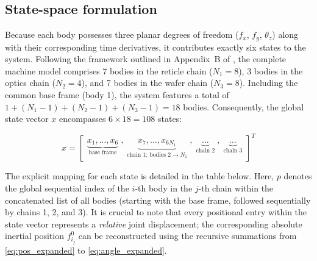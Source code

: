 \documentclass[11pt]{article}
\theoremstyle{definition}
\begin{document}
\subsection{State-space formulation}

Because each body possesses three planar degrees of freedom ($f_x$, $f_y$, $\theta_z$) along with their corresponding time derivatives, it contributes exactly six states to the system. Following the framework outlined in Appendix~B of \cite{Al-Rawashdeh2022_Caracterization}, the complete machine model comprises 7 bodies in the reticle chain ($N_1 = 8$), 3 bodies in the optics chain ($N_2 = 4$), and 7 bodies in the wafer chain ($N_3 = 8$). Including the common base frame (body 1), the system features a total of $1 + (N_1-1) + (N_2-1) + (N_3-1) = 18$ bodies. Consequently, the global state vector $x$ encompasses $6 \times 18 = 108$ states:

\begin{equation}
    x =
    \begin{bmatrix}
        \underbrace{x_1, \ldots, x_6}_{\text{base frame}} \;,\;
        \underbrace{x_7, \ldots, x_{6N_1}}_{\text{chain 1: bodies } 2 \to N_1} \;,\;
        \underbrace{\ldots}_{\text{chain 2}} \;,\;
        \underbrace{\ldots}_{\text{chain 3}}
    \end{bmatrix}^T
\end{equation}

The explicit mapping for each state is detailed in the table below. Here, $p$ denotes the global sequential index of the $i$-th body in the $j$-th chain within the concatenated list of all bodies (starting with the base frame, followed sequentially by chains 1, 2, and 3). It is crucial to note that every positional entry within the state vector represents a \emph{relative} joint displacement; the corresponding absolute inertial position $f^0_{i_j}$ can be reconstructed using the recursive summations from \eqref{eq:pos_expanded} to \eqref{eq:angle_expanded}.
\end{document}
